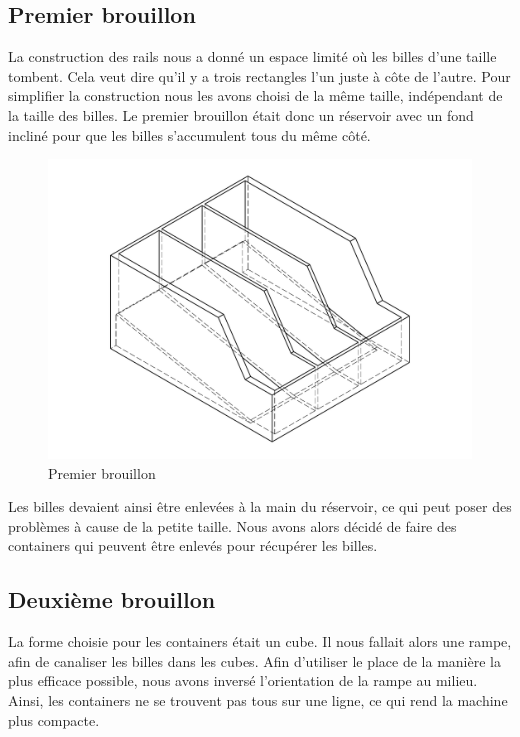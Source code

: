 \subsection{Premier brouillon}
La construction des rails nous a donné un espace limité où les billes d'une taille tombent. Cela veut dire qu'il y a trois rectangles l'un juste à côte de l'autre. Pour simplifier la construction nous les avons choisi de la même taille, indépendant de la taille des billes. Le premier brouillon était donc un réservoir avec un fond incliné pour que les billes s'accumulent tous du même côté.

\begin{figure}
    \centering
    \includegraphics[width=\textwidth]{Graphics/Reservoir_final/PREMIER_BROUILLON.pdf}
    \caption{Premier brouillon}
\end{figure}

Les billes devaient ainsi être enlevées à la main du réservoir, ce qui peut poser des problèmes à cause de la petite taille. Nous avons alors décidé de faire des containers qui peuvent être enlevés pour récupérer les billes. 

\subsection{Deuxième brouillon}
La forme choisie pour les containers était un cube. Il nous fallait alors une rampe, afin de canaliser les billes dans les cubes. Afin d'utiliser le place de la manière la plus efficace possible, nous avons inversé l'orientation de la rampe au milieu. Ainsi, les containers ne se trouvent pas tous sur une ligne, ce qui rend la machine plus compacte. 

